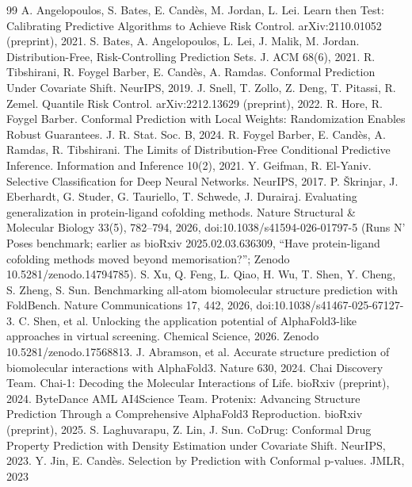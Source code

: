 \documentclass[10pt]{article}
\begin{document}
\small

\begin{thebibliography}{99}
 A. Angelopoulos, S. Bates, E. Cand\`es, M. Jordan, L. Lei.
Learn then Test: Calibrating Predictive Algorithms to Achieve Risk Control. arXiv:2110.01052 (preprint), 2021.
 S. Bates, A. Angelopoulos, L. Lei, J. Malik, M. Jordan.
Distribution-Free, Risk-Controlling Prediction Sets. J. ACM 68(6), 2021.
 R. Tibshirani, R. Foygel Barber, E. Cand\`es, A. Ramdas.
Conformal Prediction Under Covariate Shift. NeurIPS, 2019.
 J. Snell, T. Zollo, Z. Deng, T. Pitassi, R. Zemel.
Quantile Risk Control. arXiv:2212.13629 (preprint), 2022.
 R. Hore, R. Foygel Barber. Conformal Prediction with Local Weights:
Randomization Enables Robust Guarantees. J. R. Stat. Soc. B, 2024.
 R. Foygel Barber, E. Cand\`es, A. Ramdas, R. Tibshirani.
The Limits of Distribution-Free Conditional Predictive Inference. Information and Inference 10(2), 2021.
 Y. Geifman, R. El-Yaniv. Selective Classification for Deep Neural Networks. NeurIPS, 2017.
 P. \v{S}krinjar, J. Eberhardt, G. Studer, G. Tauriello, T. Schwede, J. Durairaj. Evaluating
generalization in protein-ligand cofolding methods. Nature Structural \& Molecular Biology 33(5),
782--794, 2026, doi:10.1038/s41594-026-01797-5 (Runs N' Poses benchmark; earlier as bioRxiv
2025.02.03.636309, ``Have protein-ligand cofolding methods moved beyond memorisation?''; Zenodo
10.5281/zenodo.14794785).
 S. Xu, Q. Feng, L. Qiao, H. Wu, T. Shen, Y. Cheng, S. Zheng, S. Sun. Benchmarking
all-atom biomolecular structure prediction with FoldBench. Nature Communications 17, 442, 2026,
doi:10.1038/s41467-025-67127-3.
 C. Shen, et al. Unlocking the application potential of AlphaFold3-like approaches in
virtual screening. Chemical Science, 2026. Zenodo 10.5281/zenodo.17568813.
 J. Abramson, et al. Accurate structure prediction of biomolecular interactions with
AlphaFold3. Nature 630, 2024.
 Chai Discovery Team. Chai-1: Decoding the Molecular Interactions of Life. bioRxiv (preprint), 2024.
 ByteDance AML AI4Science Team. Protenix: Advancing Structure Prediction Through a
Comprehensive AlphaFold3 Reproduction. bioRxiv (preprint), 2025.
 S. Laghuvarapu, Z. Lin, J. Sun. CoDrug: Conformal Drug Property Prediction with Density Estimation
under Covariate Shift. NeurIPS, 2023.
 Y. Jin, E. Cand\`es. Selection by Prediction with Conformal p-values. JMLR, 2023

\end{thebibliography}
\end{document}
